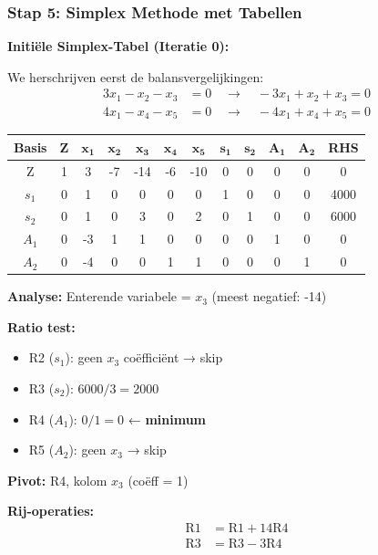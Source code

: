 \documentclass[a4paper,11pt]{article}
\begin{document}
\begin{oefenblok}[title=Lineair Programmeren — Rylon Parfums]
\subsubsection*{Stap 5: Simplex Methode met Tabellen}

\textbf{Initiële Simplex-Tabel (Iteratie 0):}

We herschrijven eerst de balansvergelijkingen:
\begin{align*}
3x_1 - x_2 - x_3 &= 0 \quad \rightarrow \quad -3x_1 + x_2 + x_3 = 0 \\
4x_1 - x_4 - x_5 &= 0 \quad \rightarrow \quad -4x_1 + x_4 + x_5 = 0
\end{align*}

\begin{center}
\small
\begin{tabular}{|c|c|c|c|c|c|c|c|c|c|c|c|}
\hline
\textbf{Basis} & \textbf{Z} & $\mathbf{x_1}$ & $\mathbf{x_2}$ & $\mathbf{x_3}$ & $\mathbf{x_4}$ & $\mathbf{x_5}$ & $\mathbf{s_1}$ & $\mathbf{s_2}$ & $\mathbf{A_1}$ & $\mathbf{A_2}$ & \textbf{RHS} \\
\hline
Z & 1 & 3 & -7 & -14 & -6 & -10 & 0 & 0 & 0 & 0 & 0 \\
\hline
$s_1$ & 0 & 1 & 0 & 0 & 0 & 0 & 1 & 0 & 0 & 0 & 4000 \\
\hline
$s_2$ & 0 & 1 & 0 & 3 & 0 & 2 & 0 & 1 & 0 & 0 & 6000 \\
\hline
$A_1$ & 0 & -3 & 1 & 1 & 0 & 0 & 0 & 0 & 1 & 0 & 0 \\
\hline
$A_2$ & 0 & -4 & 0 & 0 & 1 & 1 & 0 & 0 & 0 & 1 & 0 \\
\hline
\end{tabular}
\end{center}

\textbf{Analyse:} Enterende variabele = $x_3$ (meest negatief: -14)

\textbf{Ratio test:}
\begin{itemize}
    \item R2 ($s_1$): geen $x_3$ coëfficiënt → skip
    \item R3 ($s_2$): $6000/3 = 2000$
    \item R4 ($A_1$): $0/1 = 0$ ← \textbf{minimum}
    \item R5 ($A_2$): geen $x_3$ → skip
\end{itemize}

\textbf{Pivot:} R4, kolom $x_3$ (coëff = 1)

\textbf{Rij-operaties:}
\begin{align*}
\text{R1} &= \text{R1} + 14\text{R4} \\
\text{R3} &= \text{R3} - 3\text{R4}
\end{align*}


\end{oefenblok}
\end{document}
